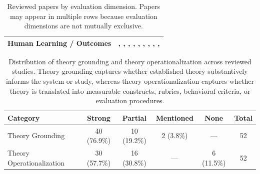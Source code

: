 \begin{table}[tbp]
\begin{tabular}{p{4cm}p{10.5cm}}
\midrule
Human Learning / Outcomes & \citealp{Berrezueta-Guzman2024Future}, \citealp{Chen2025MIND}, \citealp{Feng2025Reframe}, \citealp{Li2024Understanding}, \citealp{Louie2026Can}, \citealp{Qiu2026PsyCLIENT}, \citealp{Tanana2019Development}, \citealp{Wang2024PATIENT}, \citealp{Wang2025Psychological}, \citealp{Xiao2024HealMe} \\
\bottomrule
\end{tabular}
\caption{Reviewed papers by evaluation dimension. Papers may appear in multiple rows because evaluation dimensions are not mutually exclusive.}
\label{tab:eval-dimensions-cite}
\end{table}

\begin{table}[tbp]
\centering
\begin{tabular}{lccccc}
\toprule
\textbf{Category} &
\textbf{Strong} &
\textbf{Partial} &
\textbf{Mentioned} &
\textbf{None} &
\textbf{Total} \\
\midrule

Theory Grounding &
40 (76.9\%) &
10 (19.2\%) &
2 (3.8\%) &
--- &
52 \\

\midrule

Theory Operationalization &
30 (57.7\%) &
16 (30.8\%) &
--- &
6 (11.5\%) &
52 \\

\bottomrule
\end{tabular}
\caption{Distribution of theory grounding and theory operationalization across reviewed studies. Theory grounding captures whether established theory substantively informs the system or study, whereas theory operationalization captures whether theory is translated into measurable constructs, rubrics, behavioral criteria, or evaluation procedures.}
\label{tab:theory-stats}
\end{table}

